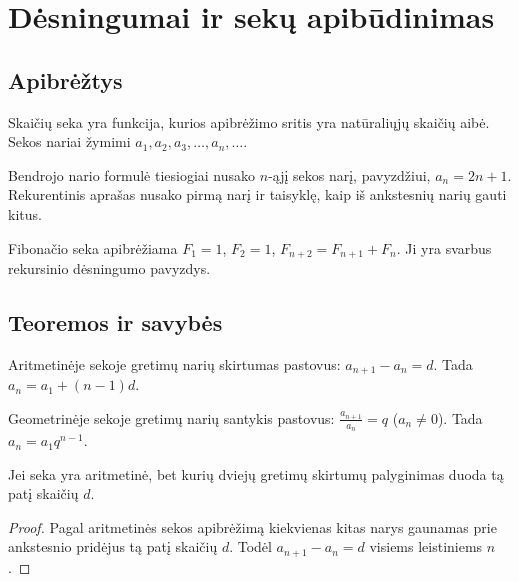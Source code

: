 \section{Dėsningumai ir sekų apibūdinimas}\label{sec:desningumai-ir-seku-apibudinimas}

\subsection{Apibrėžtys}

\begin{apibreztis}
Skaičių seka yra funkcija, kurios apibrėžimo sritis yra natūraliųjų skaičių aibė. Sekos nariai žymimi $a_1,a_2,a_3,\ldots,a_n,\ldots$.
\end{apibreztis}

\begin{apibreztis}
Bendrojo nario formulė tiesiogiai nusako $n$-ąjį sekos narį, pavyzdžiui, $a_n=2n+1$. Rekurentinis aprašas nusako pirmą narį ir taisyklę, kaip iš ankstesnių narių gauti kitus.
\end{apibreztis}

\begin{apibreztis}
Fibonačio seka apibrėžiama $F_1=1$, $F_2=1$, $F_{n+2}=F_{n+1}+F_n$. Ji yra svarbus rekursinio dėsningumo pavyzdys.
\end{apibreztis}

\subsection{Teoremos ir savybės}

\begin{savybe}
Aritmetinėje sekoje gretimų narių skirtumas pastovus: $a_{n+1}-a_n=d$. Tada $a_n=a_1+(n-1)d$.
\end{savybe}

\begin{savybe}
Geometrinėje sekoje gretimų narių santykis pastovus: $\frac{a_{n+1}}{a_n}=q$ ($a_n\ne0$). Tada $a_n=a_1q^{n-1}$.
\end{savybe}

\begin{teorema}
Jei seka yra aritmetinė, bet kurių dviejų gretimų skirtumų palyginimas duoda tą patį skaičių $d$.
\end{teorema}
\begin{proof}
Pagal aritmetinės sekos apibrėžimą kiekvienas kitas narys gaunamas prie ankstesnio pridėjus tą patį skaičių $d$. Todėl $a_{n+1}-a_n=d$ visiems leistiniems $n$.
\end{proof}

